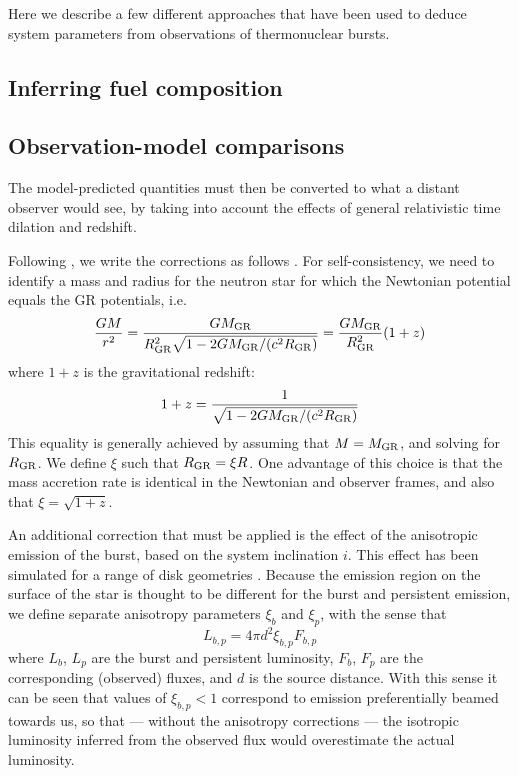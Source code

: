 \documentclass{aastex61}
\begin{document}
Here we describe a few different approaches that have been used to deduce system parameters from observations of thermonuclear bursts.

\subsection{Inferring fuel composition} 
\label{subsec:fuelcomp}

\subsection{Observation-model comparisons} 
\label{subsec:lccompare}

The model-predicted quantities must then be converted to what a distant observer would see, by taking into account the effects of general relativistic time dilation and redshift.

Following \cite{lampe16}, we write the corrections as follows \cite[see also][]{keek11}. For self-consistency, we need to identify a mass and radius for the neutron star for which the Newtonian potential equals the GR potentials, i.e.
\begin{equation}
\frac{GM}{r^2} = \frac{GM_{\rm GR}}{R^2_{\rm GR}\sqrt{1-2GM_{\rm GR}/(c^2R_{\rm GR})}} = \frac{GM_{\rm GR}}{R^2_{\rm GR}}(1+z)
\end{equation}
where $1+z$ is the gravitational redshift:
\begin{equation}
1+z = \frac{1}{\sqrt{1-2GM_{\rm GR}/(c^2R_{\rm GR})}}
\end{equation}
This equality is generally achieved by assuming that $M=M_{\rm GR}$, and solving for $R_{\rm GR}$. 
We define $\xi$ such that $R_{\rm GR}=\xi R$. 
One advantage of this choice is that the mass accretion rate is identical in the Newtonian and observer frames, and also that $\xi = \sqrt{1 + z}$. 

An additional correction that must be applied is the effect of the anisotropic emission of the burst, based on the system inclination $i$. This effect has been simulated for a range of disk geometries \cite[e.g.][]{he16}. Because the emission region on the surface of the star is thought to be different for the burst and persistent emission, we define separate anisotropy parameters $\xi_b$ and $\xi_p$, with the sense that
\begin{equation}
L_{b,p} = 4\pi d^2\xi_{b,p}F_{b,p}
\end{equation}
where $L_b$, $L_p$ are the burst and persistent luminosity, $F_b$, $F_p$ are the corresponding (observed) fluxes, and $d$ is the source distance. With this sense it can be seen that values of $\xi_{b,p}<1$ correspond to emission preferentially beamed towards us, so that --- without the anisotropy corrections --- the isotropic luminosity inferred from the observed flux would overestimate the actual luminosity.
\end{document}
